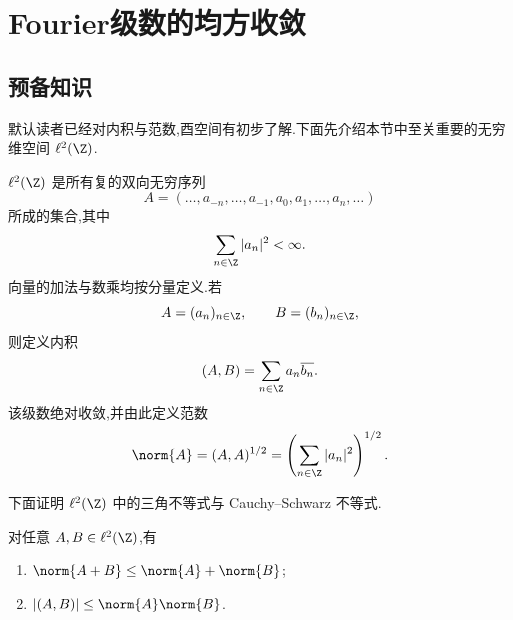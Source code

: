 \section{Fourier级数的均方收敛}

\subsection*{预备知识}

默认读者已经对内积与范数,酉空间有初步了解.下面先介绍本节中至关重要的无穷维空间 $\ell^2(\Z)$.


\begin{definition}
	$\ell^2(\Z)$ 是所有复的双向无穷序列
	\[
	A=(\ldots,a_{-n},\ldots,a_{-1},a_0,a_1,\ldots,a_n,\ldots)
	\]
	所成的集合,其中
	\[
	\sum_{n\in\Z}|a_n|^2<\infty.
	\]
	向量的加法与数乘均按分量定义.若
	\[
	A=(a_n)_{n\in\Z},\qquad B=(b_n)_{n\in\Z},
	\]
	则定义内积
	\[
	(A,B)=\sum_{n\in\Z}a_n\overline{b_n}.
	\]
	该级数绝对收敛,并由此定义范数
	\[
	\norm{A}=(A,A)^{1/2}
	=\left(\sum_{n\in\Z}|a_n|^2\right)^{1/2}.
	\]
	
\end{definition}

下面证明 $\ell^2(\Z)$ 中的三角不等式与 Cauchy--Schwarz 不等式.

\begin{proposition}
	对任意 $A,B\in\ell^2(\Z)$,有
	\begin{enumerate}
		\item $\norm{A+B}\leq \norm{A}+\norm{B}$;
		\item $|(A,B)|\leq \norm{A}\norm{B}$.
	\end{enumerate}
\end{proposition}

